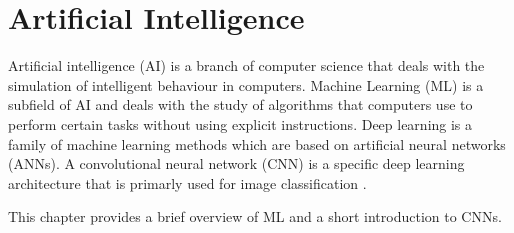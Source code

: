 \section{Artificial Intelligence}
\label{sec:ai}

Artificial intelligence (AI) is a branch of computer science that deals with the simulation of intelligent behaviour in computers.
Machine Learning (ML) is a subfield of AI and deals with the study of algorithms that computers use to perform certain tasks without using explicit instructions.
Deep learning is a family of machine learning methods which are based on artificial neural networks (ANNs).
A convolutional neural network (CNN) is a specific deep learning architecture that is primarly used for image classification \cite{ai_machine_learning}.

This chapter provides a brief overview of ML and a short introduction to CNNs.



